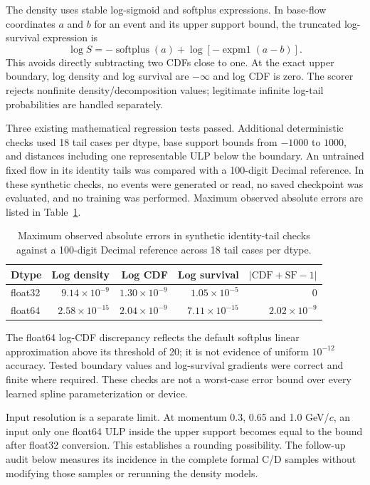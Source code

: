 \documentclass[smallextended,epjc3]{svjour3}
\begin{document}
The density uses stable log-sigmoid and softplus expressions. In base-flow
coordinates $a$ and $b$ for an event and its upper support bound, the truncated
log-survival expression is
\begin{equation}
 \log S=-\operatorname{softplus}(a)+\log[-\operatorname{expm1}(a-b)].
\end{equation}
This avoids directly subtracting two CDFs close to one. At the exact upper
boundary, log density and log survival are $-\infty$ and log CDF is zero.
The scorer rejects nonfinite density/decomposition values; legitimate
infinite log-tail probabilities are handled separately.

Three existing mathematical regression tests passed. Additional deterministic
checks used 18 tail cases per dtype, base support bounds from $-1000$ to
$1000$, and distances including one representable ULP below the boundary.
An untrained fixed flow in its identity tails was compared with a 100-digit
Decimal reference. In these synthetic checks, no events were generated or read,
no saved checkpoint was evaluated, and no training was performed. Maximum
observed absolute errors are listed in Table~\ref{tab:supp_synthetic_errors}.

\begin{table}[!htbp]
\centering
\caption{Maximum observed absolute errors in synthetic identity-tail checks
against a 100-digit Decimal reference across 18 tail cases per dtype.}
\label{tab:supp_synthetic_errors}
\begin{tabular}{lrrrr}
\toprule
Dtype & Log density & Log CDF & Log survival & $|\mathrm{CDF}+\mathrm{SF}-1|$\\
\midrule
float32 & $9.14\times10^{-9}$ & $1.30\times10^{-9}$ & $1.05\times10^{-5}$ & $0$\\
float64 & $2.58\times10^{-15}$ & $2.04\times10^{-9}$ & $7.11\times10^{-15}$ & $2.02\times10^{-9}$\\
\bottomrule
\end{tabular}
\end{table}

The float64 log-CDF discrepancy reflects the default softplus linear
approximation above its threshold of 20; it is not evidence of uniform
$10^{-12}$ accuracy. Tested boundary values and log-survival gradients were
correct and finite where required. These checks are not a worst-case error
bound over every learned spline parameterization or device.

Input resolution is a separate limit. At momentum 0.3, 0.65 and 1.0 GeV/$c$,
an input only one float64 ULP inside the upper support becomes equal to the
bound after float32 conversion. This establishes a rounding possibility.
The follow-up audit below measures its incidence in the complete formal C/D
samples without modifying those samples or rerunning the density models.
\end{document}
